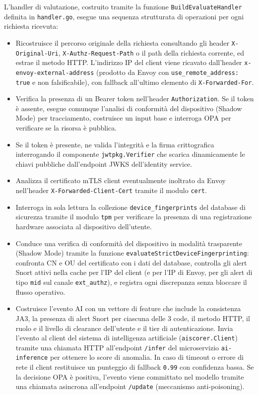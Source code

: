 L'handler di valutazione, costruito tramite la funzione \texttt{BuildEvaluateHandler} definita in \texttt{handler.go}, esegue una sequenza strutturata di operazioni per ogni richiesta ricevuta:

\begin{itemize}
    \item Ricostruisce il percorso originale della richiesta consultando gli header \texttt{X-Original-Uri}, \texttt{X-Authz-Request-Path} o il path della richiesta corrente, ed estrae il metodo HTTP. L'indirizzo IP del client viene ricavato dall'header \texttt{x-envoy-external-address} (prodotto da Envoy con \texttt{use\_remote\_address: true} e non falsificabile), con fallback all'ultimo elemento di \texttt{X-Forwarded-For}.

    \item Verifica la presenza di un Bearer token nell'header \texttt{Authorization}. Se il token è assente, esegue comunque l'analisi di conformità del dispositivo (Shadow Mode) per tracciamento, costruisce un input base e interroga OPA per verificare se la risorsa è pubblica.

    \item Se il token è presente, ne valida l'integrità e la firma crittografica interrogando il componente \texttt{jwtpkg.Verifier} che scarica dinamicamente le chiavi pubbliche dall'endpoint JWKS dell'identity service.

    \item Analizza il certificato mTLS client eventualmente inoltrato da Envoy nell'header \texttt{X-Forwarded-Client-Cert} tramite il modulo \texttt{cert}.

    \item Interroga in sola lettura la collezione \texttt{device\_fingerprints} del database di sicurezza tramite il modulo \texttt{tpm} per verificare la presenza di una registrazione hardware associata al dispositivo dell'utente.

    \item Conduce una verifica di conformità del dispositivo in modalità trasparente (Shadow Mode) tramite la funzione \texttt{evaluateStrictDeviceFingerprinting}: confronta CN e OU del certificato con i dati del database, controlla gli alert Snort attivi nella cache per l'IP del client (e per l'IP di Envoy, per gli alert di tipo \texttt{mid} sul canale \texttt{ext\_authz}), e registra ogni discrepanza senza bloccare il flusso operativo.

    \item Costruisce l'evento AI con un vettore di feature che include la consistenza JA3, la presenza di alert Snort per ciascuna delle 3 code, il metodo HTTP, il ruolo e il livello di clearance dell'utente e il tier di autenticazione. Invia l'evento al client del sistema di intelligenza artificiale (\texttt{aiscorer.Client}) tramite una chiamata HTTP all'endpoint \texttt{/infer} del microservizio \texttt{ai-inference} per ottenere lo score di anomalia. In caso di timeout o errore di rete il client restituisce un punteggio di fallback \texttt{0.99} con confidenza bassa. Se la decisione OPA è positiva, l'evento viene committato nel modello tramite una chiamata asincrona all'endpoint \texttt{/update} (meccanismo anti-poisoning).


\end{itemize}
